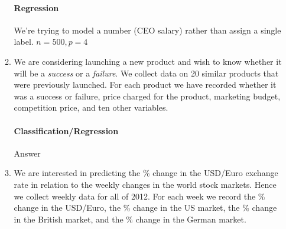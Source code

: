 \documentclass[12pt]{article}
\begin{document}
\begin{enumerate}
\begin{enumerate}
    \paragraph{Regression} We're trying to model a number (CEO salary) rather than
          assign a single label. $n = 500, p = 4$

    \item We are considering launching a new product and wish to know whether it
          will be a \textit{success} or a \textit{failure}. We collect data on 20
          similar products that were previously launched. For each product we have
          recorded whether it was a success or failure, price charged for the product,
          marketing budget, competition price, and ten other variables.\\
    \vspace{-2.5em}
    \paragraph{Classification/Regression} Answer

    \item We are interested in predicting the \% change in the USD/Euro exchange rate
          in relation to the weekly changes in the world stock markets. Hence we collect
          weekly data for all of 2012. For each week we record the \% change in the
          USD/Euro, the \% change in the US market, the \% change in the British market,
          and the \% change in the German market.\\
    \vspace{-2.5em}

\end{enumerate}
\end{enumerate}
\end{document}
